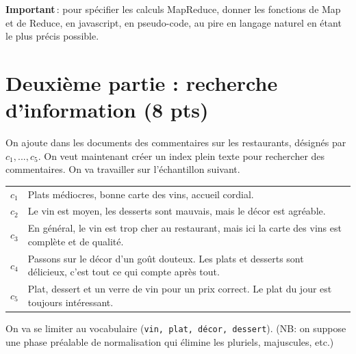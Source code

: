 \documentclass[11pt,a4paper]{article}
\begin{document}
\textbf{Important}\,: pour spécifier les calculs MapReduce, donner les fonctions de Map et de Reduce, en javascript,
en pseudo-code, au pire en langage naturel en étant le plus précis possible.


\section*{Deuxième partie : recherche d'information (8 pts)}

On ajoute dans les  documents des commentaires sur les restaurants, désignés
par $c_1, ..., c_5$. On veut maintenant
créer un index plein texte pour rechercher des commentaires. On va travailler sur l'échantillon
suivant.

\vspace*{0.3cm}

\begin{tabular}{lp{15cm}}
     $c_1$& Plats médiocres, bonne carte des vins, accueil cordial.\\
     $c_2$& Le vin est moyen, les desserts sont mauvais, mais le décor est agréable.\\
     $c_3$& En général, le vin est trop cher au restaurant, mais ici la carte
         des vins est complète et de qualité.\\
     $c_4$& Passons sur le décor d'un goût douteux. Les plats et desserts sont délicieux,
          c'est tout ce qui compte après tout.\\
     $c_5$& Plat, dessert et un verre de vin pour un prix correct. Le plat du jour
             est toujours intéressant.\\ 
\end{tabular}

\bigskip

On va se limiter au vocabulaire (\texttt{vin, plat, décor, dessert}).
(NB: on suppose
     une phase préalable de normalisation qui élimine les pluriels, majuscules, etc.)
\end{document}
